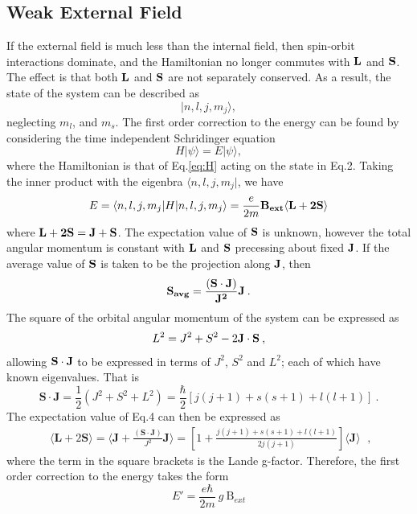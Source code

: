 \documentclass[12pt]{article}
\begin{document}
\subsection{Weak External Field}
If the external field is much less than the internal field, then spin-orbit interactions dominate, and the Hamiltonian no longer commutes with $\bf{L}$ and $\bf{S}$. The effect is that both $\bf{L}$ and $\bf{S}$ are not separately conserved. As a result, the state of the system can be described as 
\begin{equation}
|n, l, j, m_j\rangle,
\end{equation}\label{eq:state}
neglecting $m_l$, and $m_s$. The first order correction to the energy can be found by considering the time independent Schridinger equation
\begin{equation}
H|\psi\rangle = E|\psi\rangle,
\end{equation}
where the Hamiltonian is that of Eq.\ref{eq:H} acting on the state in Eq.2. Taking the inner product with the eigenbra $\langle n, l, j, m_j|$, we have
\begin{equation}
E = \langle n, l, j, m_j|H|n, l, j, m_j\rangle = \frac{e}{2m}\bf{B}_{ext}\langle \bf{L} + 2\bf{S}\rangle
\end{equation}
where $\bf{L} + 2\bf{S} = \bf{J} + \bf{S}$. The expectation value of $\bf{S}$ is unknown, however the total angular momentum is constant with $\bf{L}$ and $\bf{S}$ precessing  about fixed $\bf{J}$. \cite{Griffiths} If the average value of $\bf{S}$ is taken to be the projection along $\bf{J}$, then
\begin{equation}
\bf{S}_{avg} = \frac{(\bf{S} \cdot \bf{J})}{J^2}\bf{J}\:.
\end{equation}
\noindent
The square of the orbital angular momentum of the system can be expressed as 
\begin{equation}
L^2 = J^2 + S^2 -2\bf{J}\cdot \bf{S}\:,
\end{equation}
allowing $\bf{S} \cdot \bf{J}$ to be expressed in terms of $J^2$, $S^2$ and $L^2$; each of which have known eigenvalues. That is 
\begin{equation}
\textbf{S} \cdot \textbf{J} = \frac{1}{2}(J^2 + S^2 + L^2) = \frac{\hbar}{2}[j(j+1) + s(s+1) + l(l+1)]\:.
\end{equation}
The expectation value of Eq.4 can then be expressed as
\begin{equation}
\begin{split}
\langle \textbf{L} + 2\textbf{S}\rangle = \langle \textbf{J} + \frac{(\textbf{S} \cdot \textbf{J})}{J^2}\textbf{J}\rangle = \left[ 1+ \frac{j(j+1) + s(s+1) + l(l+1)}{2j(j+1)} \right]\langle \textbf{J}\rangle
\end{split}\:,
\end{equation}
where the term in the square brackets is the Lande g-factor. Therefore, the first order correction to the energy takes the form
\begin{equation}
E' = \frac{e\hbar}{2m} \:g\: \text{B}_{ext}
\end{equation}
\end{document}

